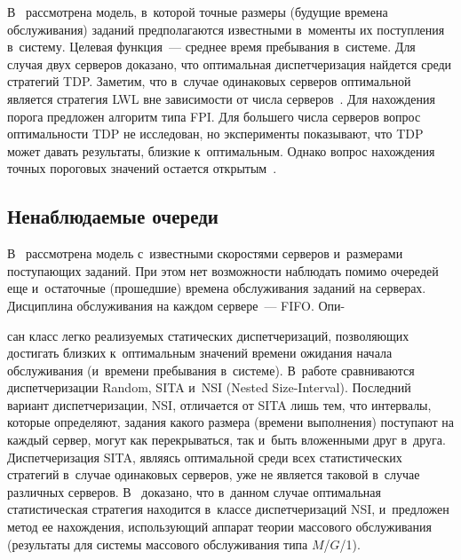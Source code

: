 \begin{multicols}{2}
    В~\cite{34-kon} рассмотрена модель, в~которой точные размеры (будущие времена 
обслуживания) заданий предполагаются известными в~моменты их поступления 
в~систему. Целевая функция~--- среднее время пребывания в~системе. Для случая двух 
серверов доказано, что оптимальная диспетчеризация найдется среди стратегий TDP. 
Заметим, что в~случае одинаковых серверов оптимальной является стратегия LWL вне 
зависимости от числа серверов~\cite{35-kon, 36-kon}. Для нахождения порога предложен 
алгоритм типа FPI. Для большего числа серверов вопрос оп\-ти\-маль\-ности TDP не 
исследован, но эксперименты показывают, что TDP может давать результаты, близкие 
к~оптимальным. Однако вопрос нахождения точных пороговых значений остается 
открытым~\cite{37-kon}.

\vspace*{-6pt}

\subsection{Ненаблюдаемые очереди}

\vspace*{-2pt}

    В~\cite{15-kon} рассмотрена модель с~известными скоростями серверов и~размерами 
поступающих заданий. При этом нет возможности наблюдать помимо очередей еще 
и~остаточные (прошедшие) времена обслуживания заданий на серверах. Дисциплина 
обслуживания на каждом сервере~--- \mbox{FIFO}. Опи-\linebreak\vspace*{-12pt}

\pagebreak

\noindent
сан класс легко реализуемых статических 
диспетчеризаций, позволяющих достигать близких к~оптимальным значений времени 
ожидания начала обслуживания (и~времени пребывания в~сис\-те\-ме). В~работе 
сравниваются диспетчеризации Random, SITA и~NSI (Nested Size-Interval). Последний 
вариант диспетчеризации, NSI, отличается от SITA лишь тем, что интервалы, которые 
определяют, задания какого размера (времени выполнения) поступают на каждый сервер, 
могут как перекрываться, так и~быть вложенными друг в~друга. Диспетчеризация SITA, 
являясь оптимальной среди всех статистических стратегий в~случае одинаковых серверов, 
уже не является таковой в~случае различных серверов. В~\cite{15-kon} доказано, что 
в~данном случае оптимальная статистическая стратегия находится в~классе 
диспетчеризаций NSI, и~предложен метод ее на\-хож\-дения, использующий аппарат 
теории массового обслуживания (результаты для системы массового обслуживания 
типа $M$/$G$/1).


\end{multicols}
